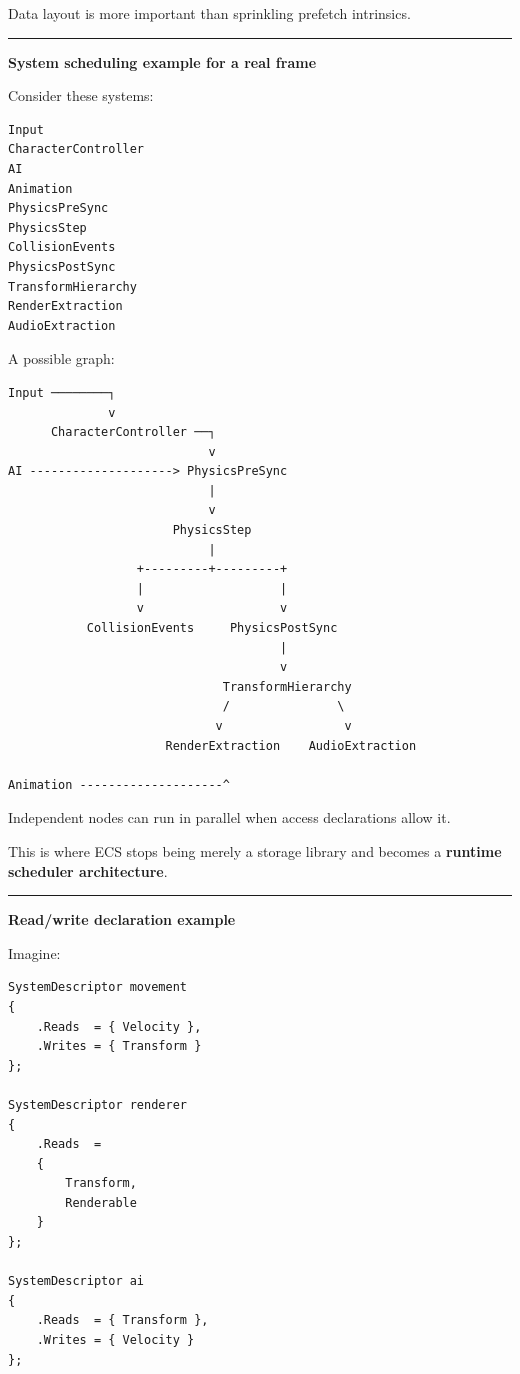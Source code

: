Data layout is more important than sprinkling prefetch intrinsics.

\begin{center}\rule{0.5\linewidth}{0.5pt}\end{center}

\textbf{System scheduling example for a real frame}

Consider these systems:

\begin{verbatim}
Input
CharacterController
AI
Animation
PhysicsPreSync
PhysicsStep
CollisionEvents
PhysicsPostSync
TransformHierarchy
RenderExtraction
AudioExtraction
\end{verbatim}

A possible graph:

\begin{verbatim}
Input ────────┐
              v
      CharacterController ──┐
                            v
AI --------------------> PhysicsPreSync
                            |
                            v
                       PhysicsStep
                            |
                  +---------+---------+
                  |                   |
                  v                   v
           CollisionEvents     PhysicsPostSync
                                      |
                                      v
                              TransformHierarchy
                              /               \
                             v                 v
                      RenderExtraction    AudioExtraction

Animation --------------------^
\end{verbatim}

Independent nodes can run in parallel when access declarations allow it.

This is where ECS stops being merely a storage library and becomes a \textbf{runtime scheduler architecture}.

\begin{center}\rule{0.5\linewidth}{0.5pt}\end{center}

\textbf{Read/write declaration example}

Imagine:

\begin{verbatim}
SystemDescriptor movement
{
    .Reads  = { Velocity },
    .Writes = { Transform }
};

SystemDescriptor renderer
{
    .Reads  =
    {
        Transform,
        Renderable
    }
};

SystemDescriptor ai
{
    .Reads  = { Transform },
    .Writes = { Velocity }
};
\end{verbatim}

